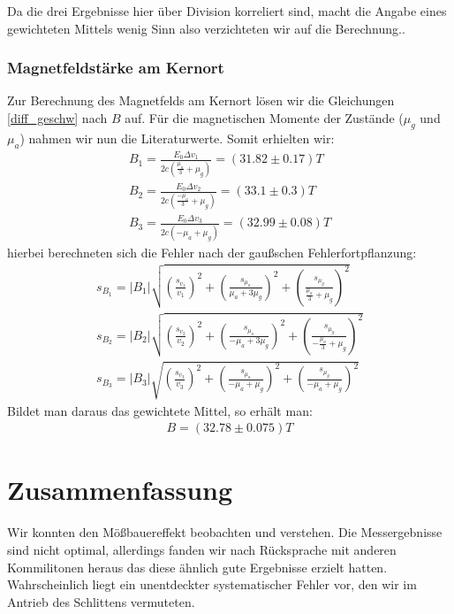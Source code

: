 \documentclass[12pt]{article}
\begin{document}
Da die drei Ergebnisse hier über Division korreliert sind, macht die Angabe eines gewichteten Mittels wenig Sinn also verzichteten wir auf die Berechnung..

\subsubsection{Magnetfeldstärke am Kernort}
Zur Berechnung des Magnetfelds am Kernort lösen wir die Gleichungen \ref{diff_geschw} nach $B$ auf. Für die magnetischen Momente der Zustände ($\mu_g$ 
und $\mu_a$) nahmen wir nun die Literaturwerte. Somit erhielten wir:
\begin{align*}
 B_1 = \frac{E_0 \Delta v_1}{2c \left( \frac{\mu_a}{3}+\mu_g \right) } = (31.82\pm0.17)T \\
 B_2 = \frac{E_0 \Delta v_2}{2c \left( \frac{-\mu_a}{3}+\mu_g \right) } = (33.1\pm0.3)T \\
 B_3 = \frac{E_0 \Delta v_3}{2c \left( -\mu_a+\mu_g \right) } = (32.99\pm0.08)T
\end{align*}
hierbei berechneten sich die Fehler nach der gaußschen Fehlerfortpflanzung:
\begin{align*}
 s_{B_1} = \left| B_1 \right| \sqrt{\left( \frac{s_{v_1}}{v_1} \right) ^2 + \left( \frac{s_{\mu_a}}{\mu_a+3\mu_g} \right) ^2 + \left( \frac{s_{\mu_g}}{\frac{\mu_a}{3}+\mu_g} \right) ^2} \\
 s_{B_2} = \left| B_2 \right| \sqrt{\left( \frac{s_{v_2}}{v_2} \right) ^2 + \left( \frac{s_{\mu_a}}{-\mu_a+3\mu_g} \right) ^2 + \left( \frac{s_{\mu_g}}{-\frac{\mu_a}{3}+\mu_g} \right) ^2} \\
 s_{B_3} = \left| B_3 \right| \sqrt{\left( \frac{s_{v_3}}{v_3} \right) ^2 + \left( \frac{s_{\mu_a}}{-\mu_a+\mu_g} \right) ^2 + \left( \frac{s_{\mu_g}}{-\mu_a+\mu_g} \right) ^2} 
\end{align*}
Bildet man daraus das gewichtete Mittel, so erhält man:
\begin{align*}
 B = (32.78 \pm 0.075)T
\end{align*}

\section{Zusammenfassung}
Wir konnten den Mößbauereffekt beobachten und verstehen. Die Messergebnisse sind nicht optimal, allerdings fanden wir nach Rücksprache mit anderen
Kommilitonen heraus das diese ähnlich gute Ergebnisse erzielt hatten. Wahrscheinlich liegt ein unentdeckter systematischer Fehler vor, den wir im Antrieb des Schlittens vermuteten.
\end{document}
